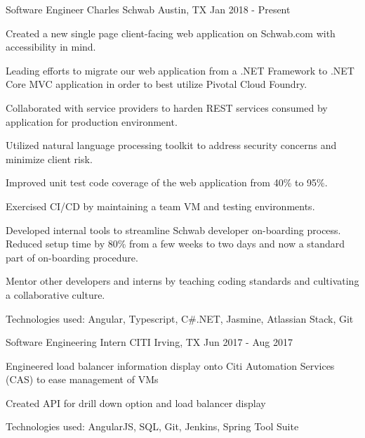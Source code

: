 

\begin{cventries}

  \cventry
    {Software Engineer} %
    {Charles Schwab} %
    {Austin, TX} %
    {Jan 2018 - Present} %
    {
      \begin{cvitems} %
        \item {Created a new single page client-facing web application on Schwab.com with accessibility in mind.}
        \item {Leading efforts to migrate our web application from a .NET Framework to .NET Core MVC application in order to best utilize Pivotal Cloud Foundry.}
        \item {Collaborated with service providers to harden REST services consumed by application for production environment.}
        \item {Utilized natural language processing toolkit to address security concerns and minimize client risk.}
        \item {Improved unit test code coverage of the web application from 40\% to 95\%.}
        \item {Exercised CI/CD by maintaining a team VM and testing environments.}
        \item {Developed internal tools to streamline Schwab developer on-boarding process. Reduced setup time by 80\% from a few weeks to two days and now a standard part of on-boarding procedure.}
        \item {Mentor other developers and interns by teaching coding standards and cultivating a collaborative culture.}
        \item {Technologies used: Angular, Typescript, C\#.NET, Jasmine, Atlassian Stack, Git}
      \end{cvitems}
    }
      
  \cventry
    {Software Engineering Intern} %
    {CITI} %
    {Irving, TX} %
    {Jun 2017 - Aug 2017} %
    {
      \begin{cvitems} %
        \item {Engineered load balancer information display onto Citi Automation Services (CAS) to ease management of VMs}
        \item {Created API for drill down option and load balancer display}
        \item {Technologies used: AngularJS, SQL, Git, Jenkins, Spring Tool Suite}
      \end{cvitems}
    }


\end{cventries}
